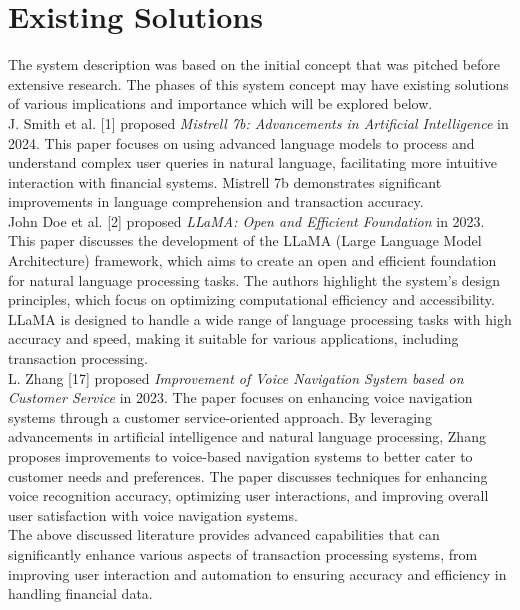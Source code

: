 \clearpage

\section{Existing Solutions}

\noindent
The system description was based on the initial concept that was pitched before extensive research. The phases of this system concept may have existing solutions of various implications and importance which will be explored below.\\

\noindent
J. Smith et al. [1] proposed {\it Mistrell 7b: Advancements in Artificial Intelligence} in 2024.
\noindent
This paper focuses on using advanced language models to process and understand complex user queries in natural language, facilitating more intuitive interaction with financial systems. Mistrell 7b demonstrates significant improvements in language comprehension and transaction accuracy. \\

\noindent
John Doe et al. [2] proposed {\it LLaMA: Open and Efficient Foundation} in 2023. 
\noindent
This paper discusses the development of the LLaMA (Large Language Model Architecture) framework, which aims to create an open and efficient foundation for natural language processing tasks. The authors highlight the system's design principles, which focus on optimizing computational efficiency and accessibility. LLaMA is designed to handle a wide range of language processing tasks with high accuracy and speed, making it suitable for various applications, including transaction processing.\\

\noindent
L. Zhang [17] proposed {\it Improvement of Voice Navigation System based on Customer Service} in 2023. 
\noindent
The paper focuses on enhancing voice navigation systems through a customer service-oriented approach. By leveraging advancements in artificial intelligence and natural language processing, Zhang proposes improvements to voice-based navigation systems to better cater to customer needs and preferences. The paper discusses techniques for enhancing voice recognition accuracy, optimizing user interactions, and improving overall user satisfaction with voice navigation systems.\\

\noindent The above discussed literature provides advanced capabilities that  can significantly enhance various aspects of transaction processing systems, from improving user interaction and automation to ensuring accuracy and efficiency in handling financial data. \\

